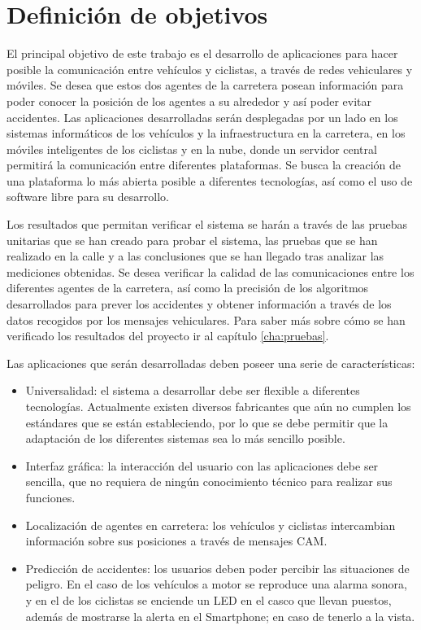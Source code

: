 \chapter{Definición de objetivos}
El principal objetivo de este trabajo es el desarrollo de aplicaciones para hacer posible la comunicación
entre vehículos y ciclistas, a través de redes vehiculares y móviles. Se desea que estos dos agentes de la
carretera posean información para poder conocer la posición de los agentes a su alrededor y así poder evitar
accidentes. Las aplicaciones desarrolladas serán desplegadas por un lado en los sistemas informáticos de los
vehículos y la infraestructura en la carretera, en los móviles inteligentes de los ciclistas y en la nube,
donde un servidor central permitirá la comunicación entre diferentes plataformas. Se busca la creación de una
plataforma lo más abierta posible a diferentes tecnologías, así como el uso de software libre para su desarrollo.

Los resultados que permitan verificar el sistema se harán a través de las pruebas unitarias que se han creado
para probar el sistema, las pruebas que se han realizado en la calle y a las conclusiones que se han llegado
tras analizar las mediciones obtenidas. Se desea verificar la calidad de las comunicaciones entre los diferentes
agentes de la carretera, así como la precisión de los algoritmos desarrollados para prever los accidentes y
obtener información a través de los datos recogidos por los mensajes vehiculares. Para saber más sobre cómo se
han verificado los resultados del proyecto ir al capítulo \ref{cha:pruebas}.

Las aplicaciones que serán desarrolladas deben poseer una serie de características:
\begin{itemize}
	\item Universalidad: el sistema a desarrollar debe ser flexible a diferentes tecnologías. Actualmente existen
	diversos fabricantes que aún no cumplen los estándares que se están estableciendo, por lo que se debe permitir
	que la adaptación de los diferentes sistemas sea lo más sencillo posible.

	\item Interfaz gráfica: la interacción del usuario con las aplicaciones debe ser sencilla, que no requiera de
	ningún conocimiento técnico para realizar sus funciones.

	\item Localización de agentes en carretera: los vehículos y ciclistas intercambian información sobre sus
	posiciones a través de mensajes CAM.

	\item Predicción de accidentes: los usuarios deben poder percibir las situaciones de peligro. En el caso de
	los vehículos a motor se reproduce una alarma sonora, y en el de los ciclistas se enciende un LED en el casco
	que llevan puestos, además de mostrarse la alerta en el Smartphone; en caso de tenerlo a la vista.
\end{itemize}
